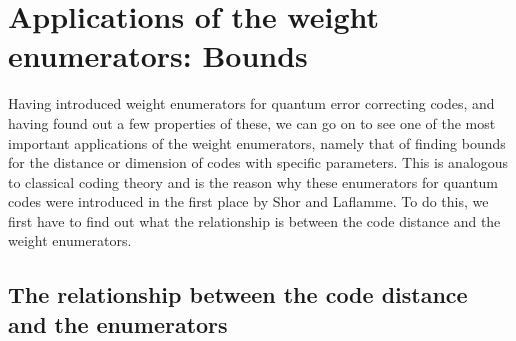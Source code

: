 \documentclass{article}
\theoremstyle{definition}
\begin{document}
\section{Applications of the weight enumerators: Bounds}

Having introduced weight enumerators for quantum error correcting codes, and having found out a few properties of these, we can go on to see one of the most important applications of the weight enumerators, namely that of finding bounds for the distance or dimension of codes with specific parameters.
This is analogous to classical coding theory and is the reason why these enumerators for quantum codes were introduced in the first place by Shor and Laflamme. To do this, we first have to find out what the relationship is between the code distance and the weight enumerators.


\subsection{The relationship between the code distance and the enumerators}
\end{document}
